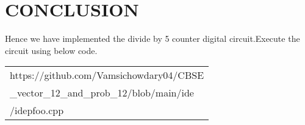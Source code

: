 \documentclass[journal,12pt,twocolumn]{IEEEtran}
\begin{document}
    \section{CONCLUSION}
    Hence we have implemented the divide by 5 counter digital circuit.Execute the circuit using below code.
    \begin{tabularx}{0.46\textwidth} { 
  | >{\centering\arraybackslash}X |}
  \hline
  https://github.com/Vamsichowdary04/CBSE\\\_vector\_12\_and\_prob\_12/blob/main/ide\\/idepfoo.cpp\\
  \hline
\end{tabularx}


 
\end{document}
